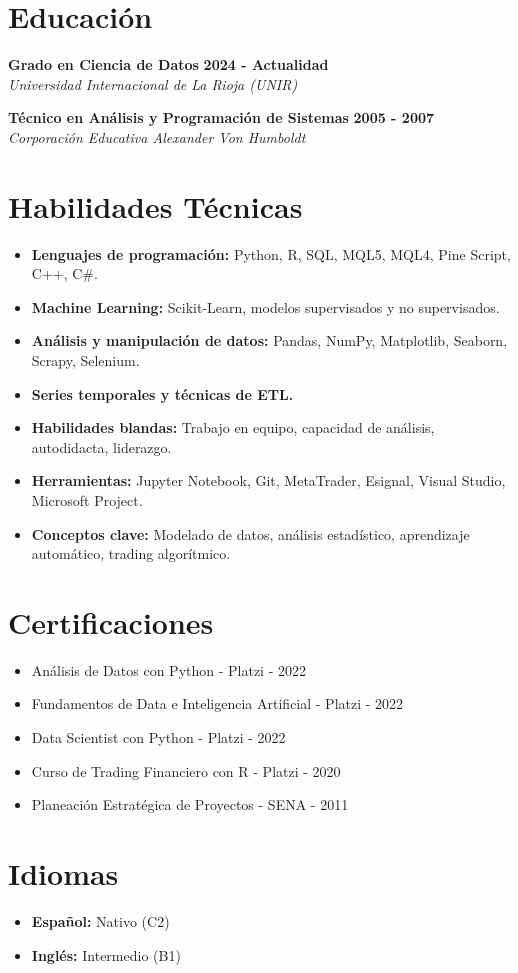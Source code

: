\documentclass[letterpaper,12pt]{article}
\begin{document}
\section*{Educaci\'on}

\textbf{Grado en Ciencia de Datos} \hfill \textbf{2024 - Actualidad}\\
\textit{Universidad Internacional de La Rioja (UNIR)}

\textbf{T\'ecnico en An\'alisis y Programaci\'on de Sistemas} \hfill \textbf{2005 - 2007}\\
\textit{Corporaci\'on Educativa Alexander Von Humboldt}

\section*{Habilidades T\'ecnicas}
\begin{itemize}[leftmargin=0.5cm]
    \item \textbf{Lenguajes de programaci\'on:} Python, R, SQL, MQL5, MQL4, Pine Script, C++, C$\#$.
    \item \textbf{Machine Learning:} Scikit-Learn, modelos supervisados y no supervisados.
    \item \textbf{An\'alisis y manipulaci\'on de datos:} Pandas, NumPy, Matplotlib, Seaborn, Scrapy, Selenium.
    \item \textbf{Series temporales y t\'ecnicas de ETL.}
    \item \textbf{Habilidades blandas:} Trabajo en equipo, capacidad de an\'alisis, autodidacta, liderazgo.
    \item \textbf{Herramientas:} Jupyter Notebook, Git, MetaTrader, Esignal, Visual Studio, Microsoft Project.
    \item \textbf{Conceptos clave:} Modelado de datos, an\'alisis estad\'istico, aprendizaje autom\'atico, trading algor\'itmico.
\end{itemize}

\section*{Certificaciones}
\begin{itemize}[leftmargin=0.5cm]
    \item An\'alisis de Datos con Python - Platzi - 2022
    \item Fundamentos de Data e Inteligencia Artificial - Platzi - 2022
    \item Data Scientist con Python - Platzi - 2022
    \item Curso de Trading Financiero con R - Platzi - 2020
    \item Planeaci\'on Estrat\'egica de Proyectos - SENA - 2011
\end{itemize}

\section*{Idiomas}
\begin{itemize}[leftmargin=0.5cm]
    \item \textbf{Espa\~nol:} Nativo (C2)
    \item \textbf{Ingl\'es:} Intermedio (B1)
\end{itemize}
\end{document}
